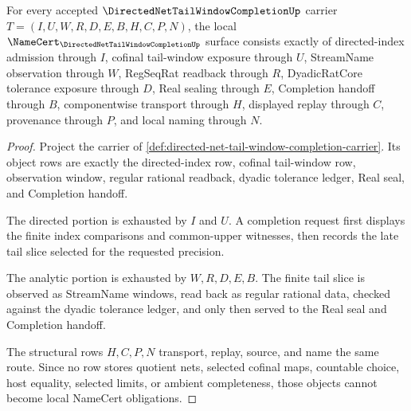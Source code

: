 \begin{theorem}
\label{thm:directed-net-tail-window-completion-namecert-obligations}
For every accepted $\DirectedNetTailWindowCompletionUp$ carrier $T=(I,U,W,R,D,E,B,H,C,P,N)$, the local $\NameCert_{\DirectedNetTailWindowCompletionUp}$ surface consists exactly of directed-index admission through $I$, cofinal tail-window exposure through $U$, StreamName observation through $W$, RegSeqRat readback through $R$, DyadicRatCore tolerance exposure through $D$, Real sealing through $E$, Completion handoff through $B$, componentwise transport through $H$, displayed replay through $C$, provenance through $P$, and local naming through $N$.
\end{theorem}
\begin{proof}
Project the carrier of \autoref{def:directed-net-tail-window-completion-carrier}. Its object rows are exactly the directed-index row, cofinal tail-window row, observation window, regular rational readback, dyadic tolerance ledger, Real seal, and Completion handoff.

The directed portion is exhausted by $I$ and $U$. A completion request first displays the finite index comparisons and common-upper witnesses, then records the late tail slice selected for the requested precision.

The analytic portion is exhausted by $W,R,D,E,B$. The finite tail slice is observed as StreamName windows, read back as regular rational data, checked against the dyadic tolerance ledger, and only then served to the Real seal and Completion handoff.

The structural rows $H,C,P,N$ transport, replay, source, and name the same route. Since no row stores quotient nets, selected cofinal maps, countable choice, host equality, selected limits, or ambient completeness, those objects cannot become local NameCert obligations.
\end{proof}

